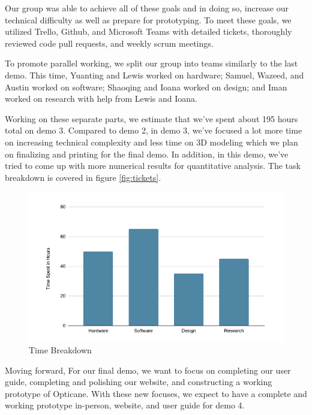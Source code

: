 \documentclass{article}
\begin{document}
Our group was able to achieve all of these goals and in doing so, increase our technical difficulty as well as prepare for prototyping. To meet these goals, we utilized Trello, Github, and Microsoft Teams with detailed tickets, thoroughly reviewed code pull requests, and weekly scrum meetings.

To promote parallel working, we split our group into teams similarly to the last demo. This time, Yuanting and Lewis worked on hardware; Samuel, Wazeed, and Austin worked on software; Shaoqing and Ioana worked on design; and Iman worked on research with help from Lewis and Ioana.

Working on these separate parts, we estimate that we've spent about 195 hours total on demo 3. Compared to demo 2, in demo 3, we've focused a lot more time on increasing technical complexity and less time on 3D modeling which we plan on finalizing and printing for the final demo. In addition, in this demo, we've tried to come up with more numerical results for quantitative analysis. The task breakdown is covered in figure \ref{fig:tickets}.

\begin{figure}[tb]
\vskip 5mm
\begin{center}
\centerline{\includegraphics[width=\columnwidth]{figs/time-breakdown}}
\caption{Time Breakdown}
\label{fig:time-fig}
\end{center}
\vskip -5mm
\end{figure} 

Moving forward, For our final demo, we want to focus on completing our user guide, completing and polishing our website, and constructing a working prototype of Opticane. With these new focuses, we expect to have a complete and working prototype in-person, website, and user guide for demo 4.
\end{document}
